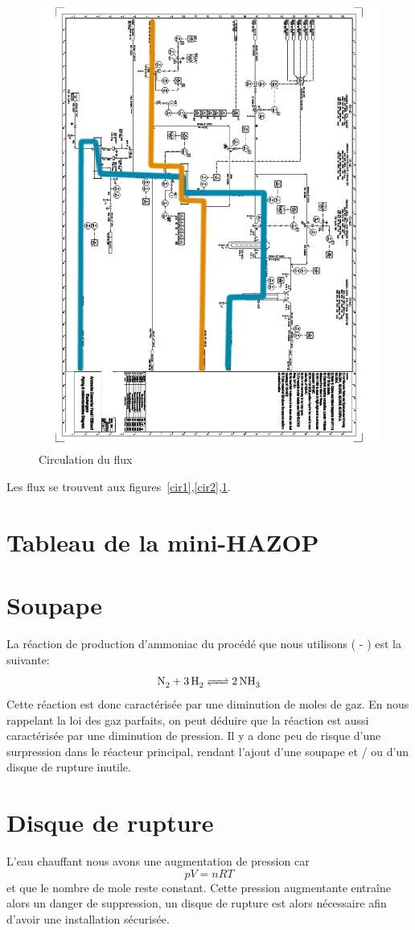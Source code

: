 \documentclass[a4paper,12pt, oneside]{article}
\begin{document}
\begin{figure}
	\includegraphics[scale=0.5]{Plan2-2.png}
	\caption{Circulation du flux}
	\label{cir3}
	
\end{figure}
Les flux se trouvent aux figures~\ref{cir1},\ref{cir2},\ref{cir3}.

\section{Tableau de la mini-HAZOP}

\section{Soupape}
La réaction de production d'ammoniac du procédé que nous utilisons ( - ) est la suivante:
$$\ce{N2 +3H2 <=> 2NH3}$$
Cette réaction est donc caractérisée par une diminution de moles de gaz. En nous rappelant la loi des gaz parfaits, on peut déduire que la réaction est aussi caractérisée par une diminution de pression. Il y a donc peu de risque d'une surpression dans le réacteur principal, rendant l'ajout d'une soupape et / ou d'un disque de rupture inutile.

\section{Disque de rupture}
L'eau chauffant nous avons une augmentation de pression car $$pV=nRT$$ et que le nombre de mole reste constant. Cette pression augmentante entraîne alors un danger de suppression, un disque de rupture est alors nécessaire afin d'avoir une installation sécurisée.
\end{document}
